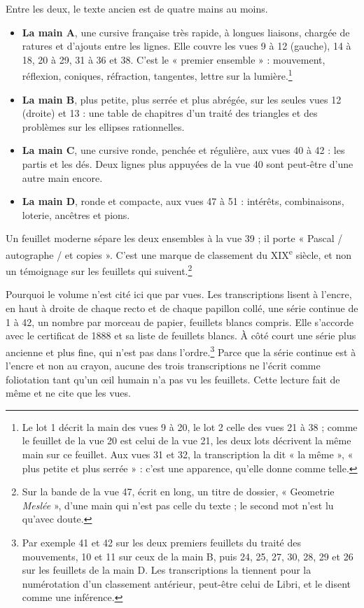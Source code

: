 \documentclass[11pt,a4paper]{article}
\begin{document}
Entre les deux, le texte ancien est de quatre mains au moins.
\begin{itemize}
  \item \textbf{La main A}, une cursive française très rapide, à longues
    liaisons, chargée de ratures et d'ajouts entre les lignes. Elle couvre les
    vues 9 à 12 (gauche), 14 à 18, 20 à 29, 31 à 36 et 38. C'est le « premier
    ensemble » : mouvement, réflexion, coniques, réfraction, tangentes, lettre
    sur la lumière.\footnote{Le lot 1 décrit la main des vues 9 à 20, le lot 2
    celle des vues 21 à 38 ; comme le feuillet de la vue 20 est celui de la vue
    21, les deux lots décrivent la même main sur ce feuillet. Aux vues 31 et 32,
    la transcription la dit « la même », « plus petite et plus serrée » : c'est
    une apparence, qu'elle donne comme telle.}
  \item \textbf{La main B}, plus petite, plus serrée et plus abrégée, sur les
    seules vues 12 (droite) et 13 : une table de chapitres d'un traité des
    triangles et des problèmes sur les ellipses rationnelles.
  \item \textbf{La main C}, une cursive ronde, penchée et régulière, aux vues
    40 à 42 : les partis et les dés. Deux lignes plus appuyées de la vue 40
    sont peut-être d'une autre main encore.
  \item \textbf{La main D}, ronde et compacte, aux vues 47 à 51 : intérêts,
    combinaisons, loterie, ancêtres et pions.
\end{itemize}
Un feuillet moderne sépare les deux ensembles à la vue 39 ; il porte « Pascal /
autographe / et copies ». C'est une marque de classement du XIX\textsuperscript{e}
siècle, et non un témoignage sur les feuillets qui suivent.\footnote{Sur la
bande de la vue 47, écrit en long, un titre de dossier, « Geometrie
\emph{Meslée} », d'une main qui n'est pas celle du texte ; le second mot n'est
lu qu'avec doute.}

Pourquoi le volume n'est cité ici que par vues. Les transcriptions lisent à
l'encre, en haut à droite de chaque recto et de chaque papillon collé, une série
continue de 1 à 42, un nombre par morceau de papier, feuillets blancs compris.
Elle s'accorde avec le certificat de 1888 et sa liste de feuillets blancs. À
côté court une série plus ancienne et plus fine, qui n'est pas dans
l'ordre.\footnote{Par exemple 41 et 42 sur les deux premiers feuillets du
traité des mouvements, 10 et 11 sur ceux de la main B, puis 24, 25, 27, 30, 28,
29 et 26 sur les feuillets de la main D. Les transcriptions la tiennent pour la
numérotation d'un classement antérieur, peut-être celui de Libri, et le disent
comme une inférence.} Parce que la série continue est à l'encre et non au
crayon, aucune des trois transcriptions ne l'écrit comme foliotation tant
qu'un œil humain n'a pas vu les feuillets. Cette lecture fait de même et ne cite
que les vues.
\end{document}
